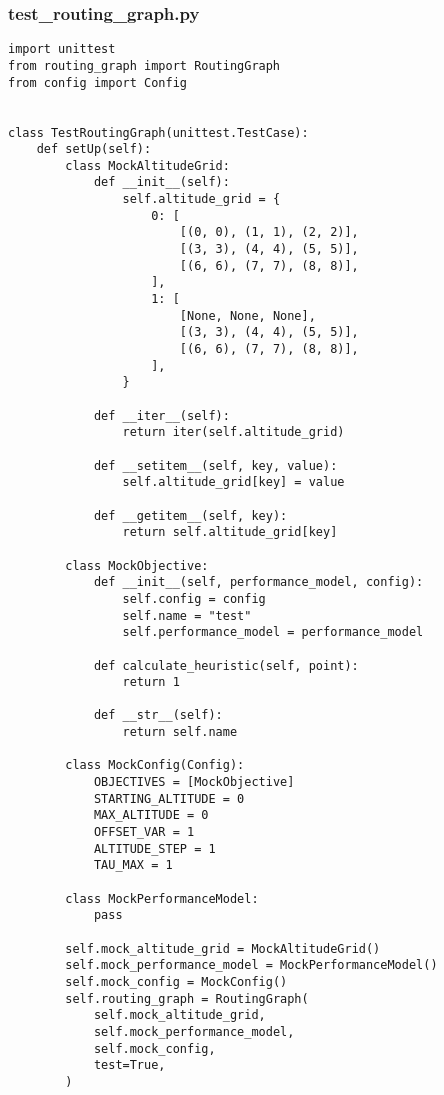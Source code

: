 \subsubsection{test_routing_graph.py}
\begin{verbatim}
import unittest
from routing_graph import RoutingGraph
from config import Config


class TestRoutingGraph(unittest.TestCase):
    def setUp(self):
        class MockAltitudeGrid:
            def __init__(self):
                self.altitude_grid = {
                    0: [
                        [(0, 0), (1, 1), (2, 2)],
                        [(3, 3), (4, 4), (5, 5)],
                        [(6, 6), (7, 7), (8, 8)],
                    ],
                    1: [
                        [None, None, None],
                        [(3, 3), (4, 4), (5, 5)],
                        [(6, 6), (7, 7), (8, 8)],
                    ],
                }

            def __iter__(self):
                return iter(self.altitude_grid)

            def __setitem__(self, key, value):
                self.altitude_grid[key] = value

            def __getitem__(self, key):
                return self.altitude_grid[key]

        class MockObjective:
            def __init__(self, performance_model, config):
                self.config = config
                self.name = "test"
                self.performance_model = performance_model

            def calculate_heuristic(self, point):
                return 1

            def __str__(self):
                return self.name

        class MockConfig(Config):
            OBJECTIVES = [MockObjective]
            STARTING_ALTITUDE = 0
            MAX_ALTITUDE = 0
            OFFSET_VAR = 1
            ALTITUDE_STEP = 1
            TAU_MAX = 1

        class MockPerformanceModel:
            pass

        self.mock_altitude_grid = MockAltitudeGrid()
        self.mock_performance_model = MockPerformanceModel()
        self.mock_config = MockConfig()
        self.routing_graph = RoutingGraph(
            self.mock_altitude_grid,
            self.mock_performance_model,
            self.mock_config,
            test=True,
        )


\end{verbatim}
